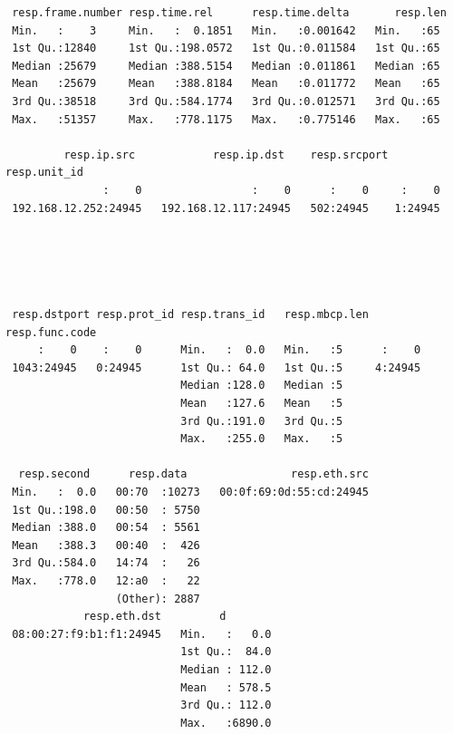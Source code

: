 \documentclass[12pt,]{article}
\begin{document}
\begin{verbatim}
 resp.frame.number resp.time.rel      resp.time.delta       resp.len 
 Min.   :    3     Min.   :  0.1851   Min.   :0.001642   Min.   :65  
 1st Qu.:12840     1st Qu.:198.0572   1st Qu.:0.011584   1st Qu.:65  
 Median :25679     Median :388.5154   Median :0.011861   Median :65  
 Mean   :25679     Mean   :388.8184   Mean   :0.011772   Mean   :65  
 3rd Qu.:38518     3rd Qu.:584.1774   3rd Qu.:0.012571   3rd Qu.:65  
 Max.   :51357     Max.   :778.1175   Max.   :0.775146   Max.   :65  
                                                                     
         resp.ip.src            resp.ip.dst    resp.srcport resp.unit_id
               :    0                 :    0      :    0     :    0     
 192.168.12.252:24945   192.168.12.117:24945   502:24945    1:24945     
                                                                        
                                                                        
                                                                        
                                                                        
                                                                        
 resp.dstport resp.prot_id resp.trans_id   resp.mbcp.len resp.func.code
     :    0    :    0      Min.   :  0.0   Min.   :5      :    0       
 1043:24945   0:24945      1st Qu.: 64.0   1st Qu.:5     4:24945       
                           Median :128.0   Median :5                   
                           Mean   :127.6   Mean   :5                   
                           3rd Qu.:191.0   3rd Qu.:5                   
                           Max.   :255.0   Max.   :5                   
                                                                       
  resp.second      resp.data                resp.eth.src  
 Min.   :  0.0   00:70  :10273   00:0f:69:0d:55:cd:24945  
 1st Qu.:198.0   00:50  : 5750                            
 Median :388.0   00:54  : 5561                            
 Mean   :388.3   00:40  :  426                            
 3rd Qu.:584.0   14:74  :   26                            
 Max.   :778.0   12:a0  :   22                            
                 (Other): 2887                            
            resp.eth.dst         d         
 08:00:27:f9:b1:f1:24945   Min.   :   0.0  
                           1st Qu.:  84.0  
                           Median : 112.0  
                           Mean   : 578.5  
                           3rd Qu.: 112.0  
                           Max.   :6890.0  
                                           
\end{verbatim}
\end{document}
